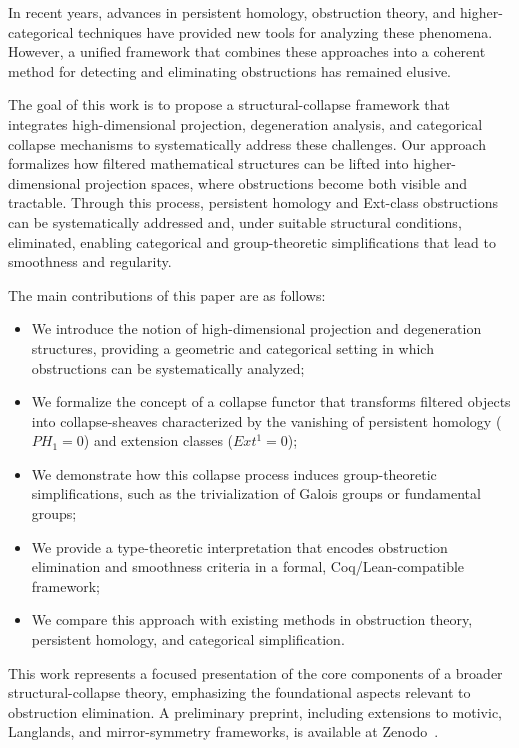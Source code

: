 \documentclass[11pt]{article}
\begin{document}
In recent years, advances in persistent homology, obstruction theory, and higher-categorical techniques have provided new tools for analyzing these phenomena. However, a unified framework that combines these approaches into a coherent method for detecting and eliminating obstructions has remained elusive.

The goal of this work is to propose a structural-collapse framework that integrates high-dimensional projection, degeneration analysis, and categorical collapse mechanisms to systematically address these challenges. Our approach formalizes how filtered mathematical structures can be lifted into higher-dimensional projection spaces, where obstructions become both visible and tractable. Through this process, persistent homology and Ext-class obstructions can be systematically addressed and, under suitable structural conditions, eliminated, enabling categorical and group-theoretic simplifications that lead to smoothness and regularity.

The main contributions of this paper are as follows:
\begin{itemize}
    \item We introduce the notion of high-dimensional projection and degeneration structures, providing a geometric and categorical setting in which obstructions can be systematically analyzed;
    \item We formalize the concept of a collapse functor that transforms filtered objects into collapse-sheaves characterized by the vanishing of persistent homology ($PH_1=0$) and extension classes ($Ext^1=0$);
    \item We demonstrate how this collapse process induces group-theoretic simplifications, such as the trivialization of Galois groups or fundamental groups;
    \item We provide a type-theoretic interpretation that encodes obstruction elimination and smoothness criteria in a formal, Coq/Lean-compatible framework;
    \item We compare this approach with existing methods in obstruction theory, persistent homology, and categorical simplification.
\end{itemize}

This work represents a focused presentation of the core components of a broader structural-collapse theory, emphasizing the foundational aspects relevant to obstruction elimination. A preliminary preprint, including extensions to motivic, Langlands, and mirror-symmetry frameworks, is available at Zenodo~\cite{ZenodoPreprint}.
\end{document}
